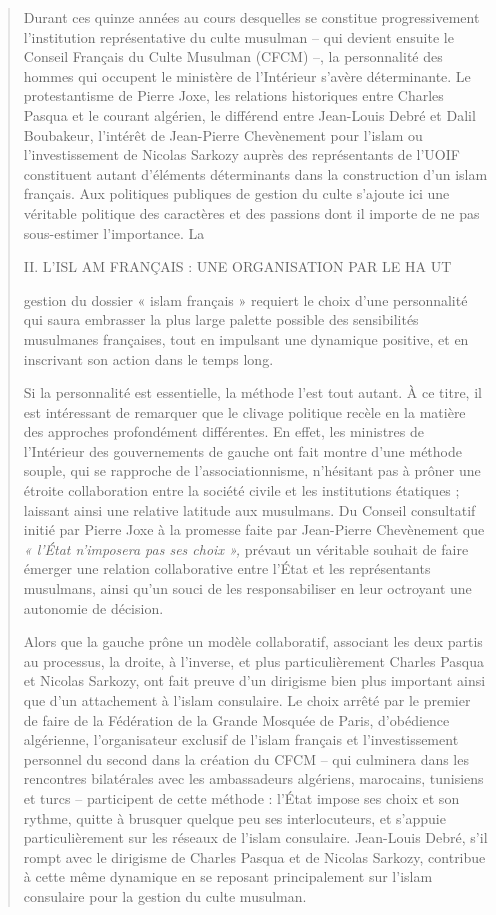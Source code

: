 \begin{quote}
Durant ces quinze années au cours desquelles se constitue
progressivement l'institution représentative du culte musulman -- qui
devient ensuite le Conseil Français du Culte Musulman (CFCM) --, la
personnalité des hommes qui occupent le ministère de l'Intérieur s'avère
déterminante. Le protestantisme de Pierre Joxe, les relations
historiques entre Charles Pasqua et le courant algérien, le différend
entre Jean-Louis Debré et Dalil Boubakeur, l'intérêt de Jean-Pierre
Chevènement pour l'islam ou l'investissement de Nicolas Sarkozy auprès
des représentants de l'UOIF constituent autant d'éléments déterminants
dans la construction d'un islam français. Aux politiques publiques de
gestion du culte s'ajoute ici une véritable politique des caractères et
des passions dont il importe de ne pas sous-estimer l'importance. La

II. L'ISL AM FRANÇAIS : UNE ORGANISATION PAR LE HA UT

gestion du dossier « islam français » requiert le choix d'une
personnalité qui saura embrasser la plus large palette possible des
sensibilités musulmanes françaises, tout en impulsant une dynamique
positive, et en inscrivant son action dans le temps long.

Si la personnalité est essentielle, la méthode l'est tout autant. À ce
titre, il est intéressant de remarquer que le clivage politique recèle
en la matière des approches profondément différentes. En effet, les
ministres de l'Intérieur des gouvernements de gauche ont fait montre
d'une méthode souple, qui se rapproche de l'associationnisme, n'hésitant
pas à prôner une étroite collaboration entre la société civile et les
institutions étatiques ; laissant ainsi une relative latitude aux
musulmans. Du Conseil consultatif initié par Pierre Joxe à la promesse
faite par Jean-Pierre Chevènement que \emph{« l'État n'imposera pas ses
choix »,} prévaut un véritable souhait de faire émerger une relation
collaborative entre l'État et les représentants musulmans, ainsi qu'un
souci de les responsabiliser en leur octroyant une autonomie de
décision.

Alors que la gauche prône un modèle collaboratif, associant les deux
partis au processus, la droite, à l'inverse, et plus particulièrement
Charles Pasqua et Nicolas Sarkozy, ont fait preuve d'un dirigisme bien
plus important ainsi que d'un attachement à l'islam consulaire. Le choix
arrêté par le premier de faire de la Fédération de la Grande Mosquée de
Paris, d'obédience algérienne, l'organisateur exclusif de l'islam
français et l'investissement personnel du second dans la création du
CFCM -- qui culminera dans les rencontres bilatérales avec les
ambassadeurs algériens, marocains, tunisiens et turcs -- participent de
cette méthode : l'État impose ses choix et son rythme, quitte à brusquer
quelque peu ses interlocuteurs, et s'appuie particulièrement sur les
réseaux de l'islam consulaire. Jean-Louis Debré, s'il rompt avec le
dirigisme de Charles Pasqua et de Nicolas Sarkozy, contribue à cette
même dynamique en se reposant principalement sur l'islam consulaire pour
la gestion du culte musulman.


\end{quote}
